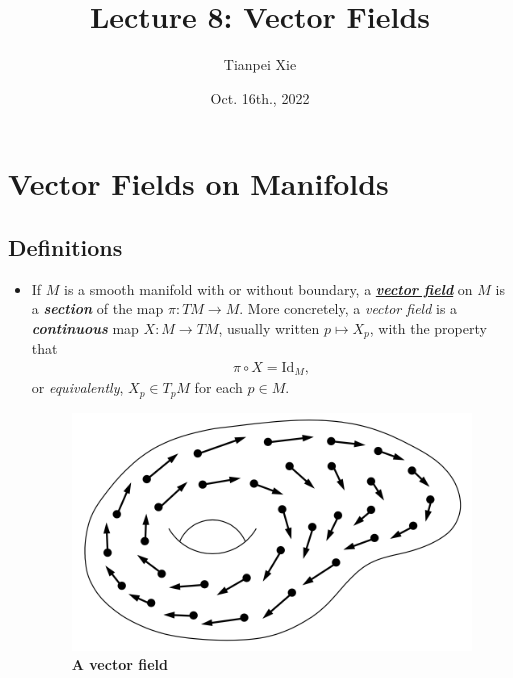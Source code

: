 \documentclass[11pt]{article}
\begin{document}
\title{Lecture 8: Vector Fields}
\author{ Tianpei Xie}
\date{Oct. 16th., 2022}
\maketitle
\tableofcontents
\newpage
\section{Vector Fields on Manifolds}
\subsection{Definitions}
\begin{itemize}
\item \begin{definition}
If $M$ is a smooth manifold with or without boundary, a \underline{\emph{\textbf{vector field}}} on $M$ is a \emph{\textbf{section}} of the map $\pi: TM \rightarrow M$. More concretely, a \emph{vector field} is a \emph{\textbf{continuous}} map $X: M \rightarrow TM$, usually written $p \mapsto X_p$, with the property that
\begin{align}
\pi \circ X = \text{Id}_{M}, \label{eqn: section_definition}
\end{align} or \emph{equivalently}, $X_p \in T_{p}M$ for each $p \in M$. 
\end{definition}

\begin{figure}
\begin{minipage}[htb]{1\linewidth}
  \centering
  \centerline{\includegraphics[scale = 0.5]{vector_fields_2.png}}
\end{minipage}
\caption{\footnotesize{\textbf{A vector field \citep{lee2003introduction}}}}
\label{fig: vector_fields}
\end{figure}


\end{itemize}
\end{document}
